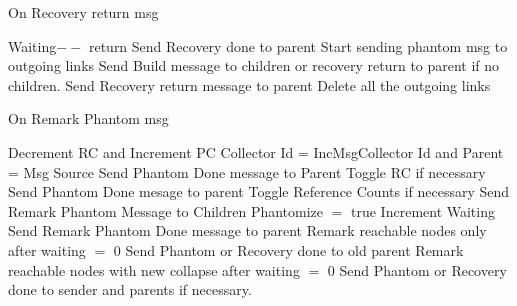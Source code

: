 \documentclass{article}
\begin{document}
\begin{algorithm}
\caption{On Recovery return msg}
\label{Recovery return message received}
\begin{algorithmic}[1]
\State Waiting$--$
\State return
\EndIf
{} 
\State Send Recovery done to parent
\State Start sending phantom msg to outgoing links
\State Send Build message to children or recovery return to parent if no children.
\State Send Recovery return message to parent
\State Delete all the outgoing links
\EndIf
\EndProcedure
\end{algorithmic}
\end{algorithm}	

\begin{algorithm}
\caption{On Remark Phantom msg}
\label{Remark Phantom message received}
\begin{algorithmic}[1]
\State Decrement RC and Increment PC
\State Collector Id = IncMsgCollector Id and Parent = Msg Source
\State Send Phantom Done message to Parent
\State Toggle RC if necessary
\State Send Phantom Done mesage to parent
\Else
\State Toggle Reference Counts if necessary
\State Send Remark Phantom Message to Children
\State Phantomize $=$ true
\State Increment Waiting
\EndIf
{}
\State Send Remark Phantom Done message to parent
\State Remark reachable nodes only after waiting $=$ 0
\State Send Phantom or Recovery done to old parent
\Else
\State Remark reachable nodes with new collapse after waiting $=$ 0
\State Send Phantom or Recovery done to sender and parents if necessary.
\EndIf
\EndProcedure
\end{algorithmic}
\end{algorithm}	
\end{document}
